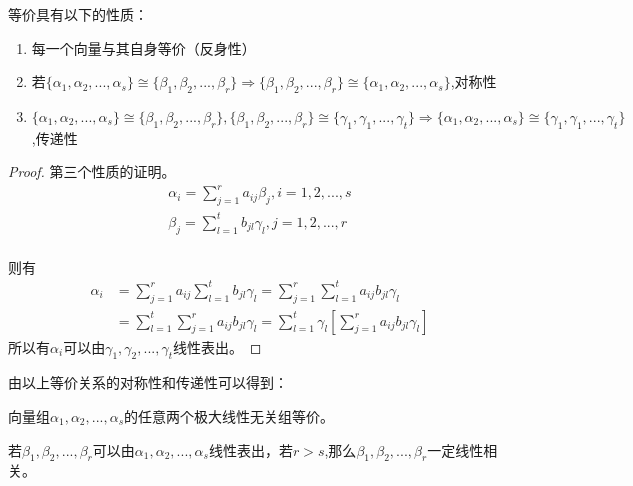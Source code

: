 \documentclass[blue,normal,cn]{elegantnote}
\begin{document}
\begin{property}
    等价具有以下的性质：
    \begin{enumerate}
            \item 每一个向量与其自身等价（反身性）
            \item 若$ \{α_1,α_2,...,α_s\} \cong \{β_1,β_2,...,β_r\} \Rightarrow \{β_1,β_2,...,β_r\} \cong \{α_1,α_2,...,α_s\}$,对称性
            \item  $\{α_1,α_2,...,α_s\} \cong \{β_1,β_2,...,β_r\},\{β_1,β_2,...,β_r\} \cong \{γ_1,γ_1,...,γ_t\} \Rightarrow  \{α_1,α_2,...,α_s\} \cong \{γ_1,γ_1,...,γ_t\}$,传递性
    \end{enumerate}
\end{property}
\begin{proof}
第三个性质的证明。
    \begin{equation*}
        \begin{aligned}
            α_i=\sum_{j=1}^{r}a_{ij}β_{j},i=1,2,...,s\\
            β_j=\sum_{l=1}^{t}b_{jl}γ_{l},j=1,2,...,r\\
        \end{aligned}
    \end{equation*}

    则有
    \begin{equation*}
        \begin{aligned}
            α_i&=\sum_{j=1}^{r}a_{ij}\sum_{l=1}^{t}b_{jl}γ_{l}=\sum_{j=1}^{r}\sum_{l=1}^{t}a_{ij}b_{jl}γ_{l}\\
            &=\sum_{l=1}^{t}\sum_{j=1}^{r}a_{ij}b_{jl}γ_{l}=\sum_{l=1}^{t}γ_{l}[\sum_{j=1}^{r}a_{ij}b_{jl}γ_{l}]
        \end{aligned}
    \end{equation*}
    所以有$α_i$可以由$γ_1,γ_2,...,γ_t$线性表出。
\end{proof}
由以上等价关系的对称性和传递性可以得到：
\begin{proposition}
向量组$α_1,α_2,...,α_s$的任意两个极大线性无关组等价。
\end{proposition}

\begin{lemma}
若$β_1,β_2,...,β_r$可以由$α_1,α_2,...,α_s$线性表出，若$r>s$,那么$β_1,β_2,...,β_r$一定线性相关。
\end{lemma}
\end{document}
